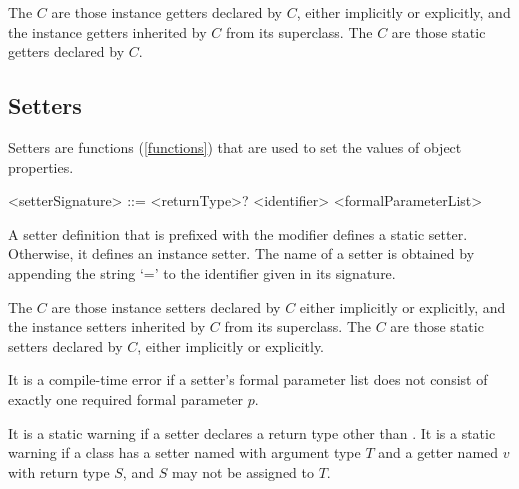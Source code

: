 \documentclass[makeidx]{article}
\begin{document}
\LMHash{}%
The  $C$ are
those instance getters declared by $C$,
either implicitly or explicitly,
and the instance getters inherited by $C$ from its superclass.
The  $C$ are
those static getters declared by $C$.



\subsection{Setters}

\LMHash{}%
Setters are functions (\ref{functions}) that are used to set the values of object properties.

\begin{grammar}
<setterSignature> ::= <returnType>? \SET{} <identifier> <formalParameterList>
\end{grammar}


\LMHash{}%
A setter definition that is prefixed with the \STATIC{} modifier defines a static setter.
Otherwise, it defines an instance setter.
The name of a setter is obtained by appending the string `=' to the identifier given in its signature.


\LMHash{}%
The  $C$ are
those instance setters declared by $C$
either implicitly or explicitly,
and the instance setters inherited by $C$ from its superclass.
The  $C$ are
those static setters declared by $C$,
either implicitly or explicitly.

\LMHash{}%
It is a compile-time error if a setter's formal parameter list
does not consist of exactly one required formal parameter $p$.

\LMHash{}%
It is a static warning if a setter declares a return type other than \VOID{}.
It is a static warning if a class has
a setter named  with argument type $T$ and
a getter named $v$ with return type $S$,
and $S$ may not be assigned to $T$.
\end{document}

